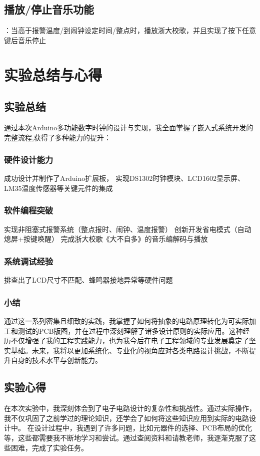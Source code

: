 \documentclass[10.5pt]{config}
\begin{document}
\subsection{播放/停止音乐功能}
：当高于报警温度/到闹钟设定时间/整点时，播放浙大校歌，并且实现了按下任意键后音乐停止

\section{实验总结与心得}
\subsection{实验总结}

通过本次Arduino多功能数字时钟的设计与实现，我全面掌握了嵌入式系统开发的完整流程,获得了多种能力的提升：

\subsubsection{硬件设计能力}
成功设计并制作了Arduino扩展板，
实现DS1302时钟模块、LCD1602显示屏、LM35温度传感器等关键元件的集成

\subsubsection{软件编程突破}
实现非阻塞式报警系统（整点报时、闹钟、温度报警）
创新开发省电模式（自动熄屏+按键唤醒）
完成浙大校歌《大不自多》的音乐编解码与播放

\subsubsection{系统调试经验}
排查出了LCD尺寸不匹配、蜂鸣器接地异常等硬件问题

\subsubsection{小结}
通过这一系列密集且细致的实践，我掌握了如何将抽象的电路原理转化为可实际加工和测试的PCB版图，并在过程中深刻理解了诸多设计原则的实际应用。这种经历不仅增强了我的工程实践能力，也为我今后在电子工程领域的专业发展奠定了坚实基础。未来，我将以更加系统化、专业化的视角应对各类电路设计挑战，不断提升自身的技术水平与创新能力。
\subsection{实验心得}
在本次实验中，我深刻体会到了电子电路设计的复杂性和挑战性。通过实际操作，我不仅巩固了之前学过的理论知识，还学会了如何将这些知识应用到实际的电路设计中。
在设计过程中，我遇到了许多问题，比如元器件的选择、PCB布局的优化等，这些都需要我不断地学习和尝试。通过查阅资料和请教老师，我逐渐克服了这些困难，完成了实验任务。
\end{document}
